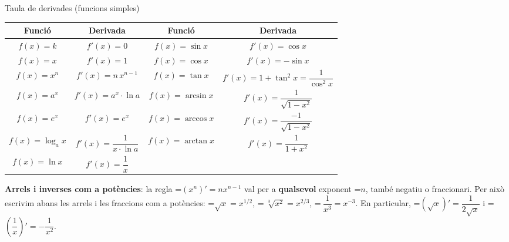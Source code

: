 \documentclass[11pt,a4paper]{article}
\newcommand{\fmm}[1]{\setbox0=\hbox{$#1$}\ifdim\wd0>\linewidth\[#1\]\else\mbox{\box0}\fi}
\newcommand{\fmuline}[1]{\textbf{\color{fmaccent}#1}}
\begin{document}
  
\begin{fmdef}{Taula de derivades (funcions simples)}
\begin{center}\renewcommand{\arraystretch}{1.5}\begin{tabular}{cccc}\toprule
\textbf{Funció} & \textbf{Derivada} & \textbf{Funció} & \textbf{Derivada}\\\midrule
$f(x)=k$ & $f'(x)=0$ & $f(x)=\sin x$ & $f'(x)=\cos x$\\
$f(x)=x$ & $f'(x)=1$ & $f(x)=\cos x$ & $f'(x)=-\sin x$\\
$f(x)=x^n$ & $f'(x)=n\,x^{n-1}$ & $f(x)=\tan x$ & $f'(x)=1+\tan^2x=\dfrac{1}{\cos^2x}$\\
$f(x)=a^x$ & $f'(x)=a^x\cdot\ln a$ & $f(x)=\arcsin x$ & $f'(x)=\dfrac{1}{\sqrt{1-x^2}}$\\
$f(x)=e^x$ & $f'(x)=e^x$ & $f(x)=\arccos x$ & $f'(x)=\dfrac{-1}{\sqrt{1-x^2}}$\\
$f(x)=\log_a x$ & $f'(x)=\dfrac{1}{x\cdot\ln a}$ & $f(x)=\arctan x$ & $f'(x)=\dfrac{1}{1+x^2}$\\[2ex]
$f(x)=\ln x$ & $f'(x)=\dfrac1x$ &  & \\[2ex]
\bottomrule\end{tabular}\end{center}

      
\begin{fmnote}\fmuline{Arrels i inverses com a potències}: la regla \fmm{(x^n)'=nx^{n-1}} val per a \textbf{qualsevol} exponent \fmm{n}, també negatiu o fraccionari. Per això escrivim abans les arrels i les fraccions com a potències:
        \fmm{\sqrt x=x^{1/2}}, \fmm{\ \sqrt[3]{x^2}=x^{2/3}}, \fmm{\ \dfrac{1}{x^3}=x^{-3}}. En particular, \fmm{\left(\sqrt x\right)'=\dfrac{1}{2\sqrt x}} i \fmm{\left(\dfrac1x\right)'=-\dfrac{1}{x^2}}.\end{fmnote}
\end{fmdef}
\end{document}
